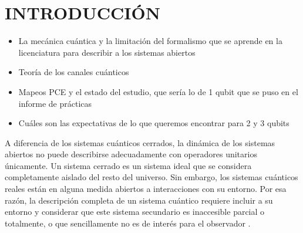 \chapter{INTRODUCCIÓN}
\textcolor{mycolor}{
\begin{itemize}
\item La mecánica cuántica y la limitación del formalismo que se 
aprende en la licenciatura para describir a los sistemas abiertos
\item Teoría de los canales cuánticos
\item Mapeos PCE y el estado del estudio, que sería lo de 1
qubit que se puso en el informe de prácticas
\item Cuáles son las expectativas de lo que queremos encontrar 
para 2 y 3 qubits
\end{itemize}
}

A diferencia de los sistemas cuánticos cerrados, la dinámica 
de los sistemas abiertos no puede describirse adecuadamente 
con operadores unitarios únicamente.
Un sistema cerrado es un sistema ideal que se considera completamente
aislado del resto del universo. Sin embargo, los sistemas cuánticos 
reales están en alguna medida abiertos a interacciones con su entorno.
Por esa razón, la descripción completa de un sistema cuántico requiere
incluir a su entorno y considerar que este sistema secundario
es inaccesible parcial o totalmente, o que sencillamente no es de interés 
para el observador \cite{schlosshauer2007decoherence}.




